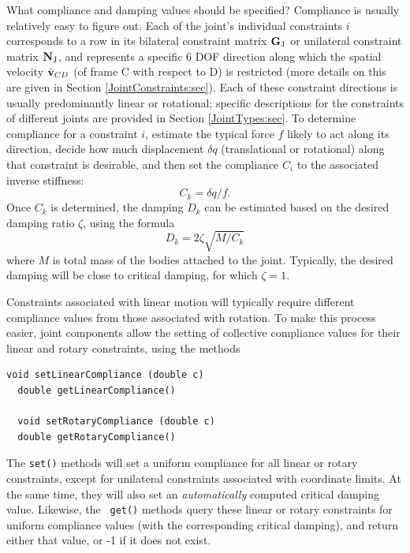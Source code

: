 What compliance and damping values should be specified? Compliance is
usually relatively easy to figure out. Each of the joint's individual
constraints $i$ corresponds to a row in its bilateral constraint matrix
${\bf G}_\text{J}$ or unilateral constraint matrix ${\bf N}_\text{J}$, and represents a
specific 6 DOF direction along which the spatial velocity
$\hat{{\bf v}}_{CD}$ (of frame C with respect to D) is restricted (more
details on this are given in Section \ref{JointConstraints:sec}).
Each of these constraint directions is usually predominantly linear or
rotational; specific descriptions for the constraints of different
joints are provided in Section \ref{JointTypes:sec}. To determine
compliance for a constraint $i$, estimate the typical force $f$ likely
to act along its direction, decide how much displacement $\delta q$
(translational or rotational) along that constraint is desirable, and
then set the compliance $C_i$ to the associated inverse stiffness:
%
\begin{equation}
C_k = \delta q/f.
\end{equation}
%
Once $C_k$ is determined, the damping $D_k$ can be estimated based on
the desired damping ratio $\zeta$, using the formula
%
\begin{equation}
D_k = 2 \zeta \sqrt{M/C_k}
\label{constraintDamping:eqn}
\end{equation}
%
where $M$ is total mass of the bodies attached to the joint.
Typically, the desired damping will be close to critical damping, for
which $\zeta = 1$.

Constraints associated with linear motion will typically require
different compliance values from those associated with rotation.  To
make this process easier, joint components allow the setting of
collective compliance values for their linear and rotary constraints,
using the methods
%
\begin{lstlisting}[]
  void setLinearCompliance (double c)
  double getLinearCompliance()

  void setRotaryCompliance (double c)
  double getRotaryCompliance()
\end{lstlisting}
%
The {\tt set()} methods will set a uniform compliance for all linear or
rotary constraints, except for unilateral constraints associated with
coordinate limits. At the same time, they will also set an {\it
automatically} computed critical damping value. Likewise, the {\tt
get()} methods query these linear or rotary constraints for uniform
compliance values (with the corresponding critical damping), and
return either that value, or -1 if it does not exist.


